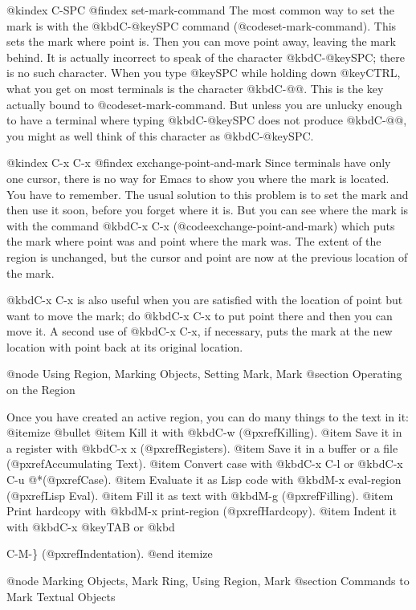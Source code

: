 {{{{{{@kindex C-SPC
@findex set-mark-command
  The most common way to set the mark is with the @kbd{C-@key{SPC}} command
(@code{set-mark-command}).  This sets the mark where point is.  Then you
can move point away, leaving the mark behind.  It is actually incorrect to
speak of the character @kbd{C-@key{SPC}}; there is no such character.  When
you type @key{SPC} while holding down @key{CTRL}, what you get on most
terminals is the character @kbd{C-@@}.  This is the key actually bound to
@code{set-mark-command}.  But unless you are unlucky enough to have a
terminal where typing @kbd{C-@key{SPC}} does not produce @kbd{C-@@}, you
might as well think of this character as @kbd{C-@key{SPC}}.

@kindex C-x C-x
@findex exchange-point-and-mark
  Since terminals have only one cursor, there is no way for Emacs to show
you where the mark is located.  You have to remember.  The usual solution
to this problem is to set the mark and then use it soon, before you forget
where it is.  But you can see where the mark is with the command @kbd{C-x
C-x} (@code{exchange-point-and-mark}) which puts the mark where point was and
point where the mark was.  The extent of the region is unchanged, but the
cursor and point are now at the previous location of the mark.

  @kbd{C-x C-x} is also useful when you are satisfied with the location of
point but want to move the mark; do @kbd{C-x C-x} to put point there and
then you can move it.  A second use of @kbd{C-x C-x}, if necessary, puts
the mark at the new location with point back at its original location.

@node Using Region, Marking Objects, Setting Mark, Mark
@section Operating on the Region

  Once you have created an active region, you can do many things to
the text in it:
@itemize @bullet
@item
Kill it with @kbd{C-w} (@pxref{Killing}).
@item
Save it in a register with @kbd{C-x x} (@pxref{Registers}).
@item
Save it in a buffer or a file (@pxref{Accumulating Text}).
@item
Convert case with @kbd{C-x C-l} or @kbd{C-x C-u} @*(@pxref{Case}).
@item
Evaluate it as Lisp code with @kbd{M-x eval-region} (@pxref{Lisp Eval}).
@item
Fill it as text with @kbd{M-g} (@pxref{Filling}).
@item
Print hardcopy with @kbd{M-x print-region} (@pxref{Hardcopy}).
@item
Indent it with @kbd{C-x @key{TAB}} or @kbd{C-M-\} (@pxref{Indentation}).
@end itemize

@node Marking Objects, Mark Ring, Using Region, Mark
@section Commands to Mark Textual Objects

}}}}}}}
